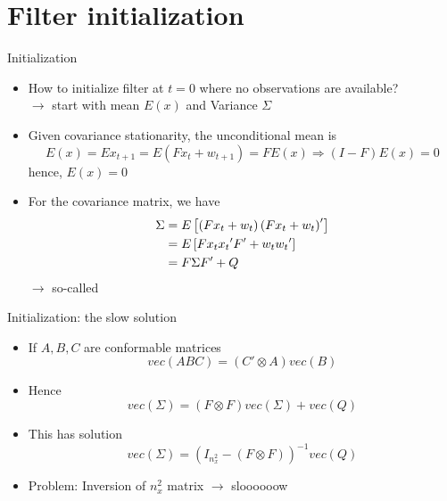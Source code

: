 \documentclass[handout,usepdftitle=false,xcolor=dvipsnames,aspectratio=169]{beamer}
\begin{document}
\section[Initialization]{Filter initialization}
\begin{frame}{Initialization}
  \begin{itemize}
    \item How to initialize filter at $t=0$ where no observations are available?\\\vspace{0.2cm}
          $\rightarrow$ start with  mean $E(x)$ and Variance $\Sigma$\vspace{0.2cm}
    \item Given covariance stationarity, the unconditional mean is
          \[
            E(x)=E{x_{t + 1}} = E(F{x_t} + {w_{t + 1}})=FE(x) \Rightarrow (I-F)E(x)=0
          \]
          hence, $E(x)=0$\vspace{0.2cm}
    \item For the covariance matrix, we have
          \begin{align}
            \Sigma & =E\left[\left( {F{x_t}+ {w _t}} \right)\left( {F{x_t} + {w _t}} \right)'\right]\notag \\
                   & = {E}\left[ {F{x_t}{x_t}'F' + {w_t}{w_t}'} \right]\notag                              \\
                   & = F\Sigma F' + Q
          \end{align}
          $\rightarrow$ so-called 
  \end{itemize}
\end{frame}

\begin{frame}{Initialization: the slow solution}
  \begin{itemize}
    \item If $A,B,C$ are conformable matrices
          \[
            vec(ABC)=(C'\otimes A)vec(B)
          \]
    \item Hence
          \[
            vec(\Sigma)=(F\otimes F)vec(\Sigma)+vec(Q)
          \]
    \item This has solution
          \begin{equation}
            vec(\Sigma)=\left(I_{n_x^2}-(F\otimes F)\right)^{-1}vec(Q)
          \end{equation}
    \item Problem: Inversion of $n_x^2$ matrix $\rightarrow$ sloooooow\vspace{0.2cm}
  \end{itemize}
\end{frame}
\end{document}
